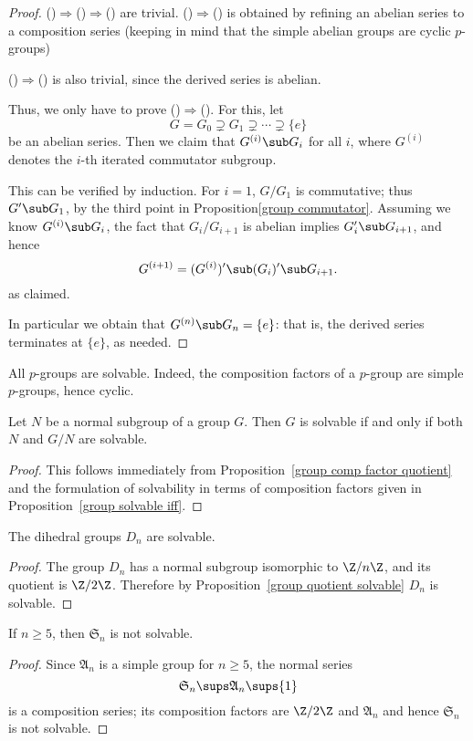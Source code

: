\begin{proof}
()$\Rightarrow$()$\Rightarrow$() are trivial. ()$\Rightarrow$() is obtained 
by refining an abelian series to a composition series (keeping in mind that the simple abelian groups are cyclic $p$-groups)\par
()$\Rightarrow$() is also trivial, since the derived series is abelian.\par
Thus, we only have to prove ()$\Rightarrow$(). For this, let
\[G=G_0\supsetneq G_1\supsetneq\cdots\supsetneq\{e\}\]
be an abelian series. Then we claim that $G^{(i)}\sub G_i$ for all $i$, where $G^{(i)}$ denotes
the $i$-th iterated commutator subgroup.\par
This can be verified by induction. For $i=1$, $G/G_1$ is commutative; thus $G'\sub G_1$, by the third 
point in Proposition\ref{group commutator}. Assuming we know $G^{(i)}\sub G_i$, the fact that $G_i/G_{i+1}$ is abelian 
implies $G_i'\sub G_{i+1}$, and hence
\[G^{(i+1)}=(G^{(i)})'\sub(G_i)'\sub G_{i+1}.\]
as claimed.\par
In particular we obtain that $G^{(n)}\sub G_n=\{e\}$: that is, the derived series terminates at 
$\{e\}$, as needed.
\end{proof}
\begin{example}
All $p$-groups are solvable. Indeed, the composition factors of a $p$-group are simple $p$-groups, hence cyclic.
\end{example}
\begin{proposition}\label{group quotient solvable}
Let $N$ be a normal subgroup of a group $G$. Then $G$ is solvable if and only if both $N$ and $G/N$ are solvable.
\end{proposition}
\begin{proof}
This follows immediately from Proposition~\ref{group comp factor quotient} and the formulation of solvability in terms of composition factors given in Proposition~\ref{group solvable iff}.
\end{proof}
\begin{corollary}
The dihedral groups $D_n$ are solvable.
\end{corollary}
\begin{proof}
The group $D_n$ has a normal subgroup isomorphic to $\Z/n\Z$, and its quotient is $\Z/2\Z$. Therefore by Proposition~\ref{group quotient solvable} $D_n$ is solvable.
\end{proof}
\begin{proposition}
If $n\geq 5$, then $\mathfrak{S}_n$ is not solvable.
\end{proposition}
\begin{proof}
Since $\mathfrak{A}_n$ is a simple group for $n\geq 5$, the normal series
\[\mathfrak{S}_n\sups\mathfrak{A}_n\sups\{1\}\]
is a composition series; its composition factors are $\Z/2\Z$ and $\mathfrak{A}_n$ and hence $\mathfrak{S}_n$ 
is not solvable.
\end{proof}
